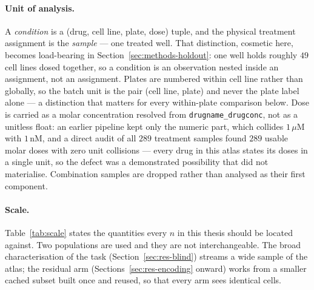 \paragraph{Unit of analysis.} A \emph{condition} is a (drug, cell line, plate, dose) tuple, and the
physical treatment assignment is the \emph{sample} --- one treated well. That distinction, cosmetic
here, becomes load-bearing in Section~\ref{sec:methods-holdout}: one well holds roughly $49$ cell
lines dosed together, so a condition is an observation nested inside an assignment, not an
assignment. Plates are numbered within cell line rather than globally, so the batch unit is the
pair (cell line, plate) and never the plate label alone --- a distinction that matters for every
within-plate comparison below. Dose is carried as a molar concentration resolved from
\texttt{drugname\_drugconc}, not as a unitless float: an earlier pipeline kept only the numeric
part, which collides $1\,\mu$M with $1\,$nM, and a direct audit of all $289$ treatment samples found
$289$ usable molar doses with zero unit collisions --- every drug in this atlas states its doses in
a single unit, so the defect was a demonstrated possibility that did not materialise. Combination
samples are dropped rather than analysed as their first component.

\paragraph{Scale.} Table~\ref{tab:scale} states the quantities every $n$ in this thesis should be
located against. Two populations are used and they are not interchangeable. The broad
characterisation of the task (Section~\ref{sec:res-blind}) streams a wide sample of the atlas; the
residual arm (Sections~\ref{sec:res-encoding} onward) works from a smaller cached subset built once
and reused, so that every arm sees identical cells.

